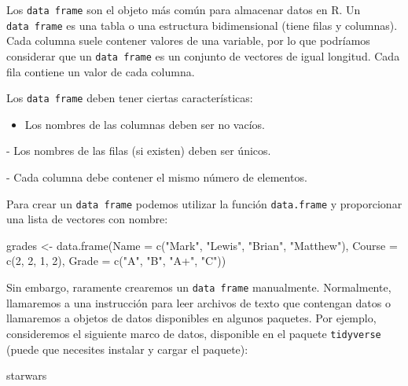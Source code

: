 \documentclass[
  letterpaper,
  DIV=11,
  numbers=noendperiod]{scrreprt}
\newenvironment{Shaded}{\begin{snugshade}}{\end{snugshade}}
\newcommand{\AttributeTok}[1]{\textcolor[rgb]{0.40,0.45,0.13}{#1}}
\newcommand{\DecValTok}[1]{\textcolor[rgb]{0.68,0.00,0.00}{#1}}
\newcommand{\FunctionTok}[1]{\textcolor[rgb]{0.28,0.35,0.67}{#1}}
\newcommand{\NormalTok}[1]{\textcolor[rgb]{0.00,0.23,0.31}{#1}}
\newcommand{\OtherTok}[1]{\textcolor[rgb]{0.00,0.23,0.31}{#1}}
\newcommand{\StringTok}[1]{\textcolor[rgb]{0.13,0.47,0.30}{#1}}
\providecommand{\tightlist}{%
  \setlength{\itemsep}{0pt}\setlength{\parskip}{0pt}}\usepackage{longtable,booktabs,array}
\begin{document}
Los \texttt{data\ frame} son el objeto más común para almacenar datos en
R. Un \texttt{data\ frame} es una tabla o una estructura bidimensional
(tiene filas y columnas). Cada columna suele contener valores de una
variable, por lo que podríamos considerar que un \texttt{data\ frame} es
un conjunto de vectores de igual longitud. Cada fila contiene un valor
de cada columna.

Los \texttt{data\ frame} deben tener ciertas características:

\begin{itemize}
\tightlist
\item
  Los nombres de las columnas deben ser no vacíos.
\end{itemize}

- Los nombres de las filas (si existen) deben ser únicos.

- Cada columna debe contener el mismo número de elementos.

Para crear un \texttt{data\ frame} podemos utilizar la función
\texttt{data.frame} y proporcionar una lista de vectores con nombre:

\begin{Shaded}
\begin{Highlighting}[]
\NormalTok{grades }\OtherTok{\textless{}{-}} \FunctionTok{data.frame}\NormalTok{(}\AttributeTok{Name =} \FunctionTok{c}\NormalTok{(}\StringTok{"Mark"}\NormalTok{, }\StringTok{"Lewis"}\NormalTok{, }\StringTok{"Brian"}\NormalTok{, }\StringTok{"Matthew"}\NormalTok{),}
                     \AttributeTok{Course =} \FunctionTok{c}\NormalTok{(}\DecValTok{2}\NormalTok{, }\DecValTok{2}\NormalTok{, }\DecValTok{1}\NormalTok{, }\DecValTok{2}\NormalTok{),}
                     \AttributeTok{Grade =} \FunctionTok{c}\NormalTok{(}\StringTok{"A"}\NormalTok{, }\StringTok{"B"}\NormalTok{, }\StringTok{"A+"}\NormalTok{, }\StringTok{"C"}\NormalTok{))}
\end{Highlighting}
\end{Shaded}

Sin embargo, raramente crearemos un \texttt{data\ frame} manualmente.
Normalmente, llamaremos a una instrucción para leer archivos de texto
que contengan datos o llamaremos a objetos de datos disponibles en
algunos paquetes. Por ejemplo, consideremos el siguiente marco de datos,
disponible en el paquete \texttt{tidyverse} (puede que necesites
instalar y cargar el paquete):

\begin{Shaded}
\begin{Highlighting}[]
\NormalTok{starwars}
\end{Highlighting}
\end{Shaded}
\end{document}
